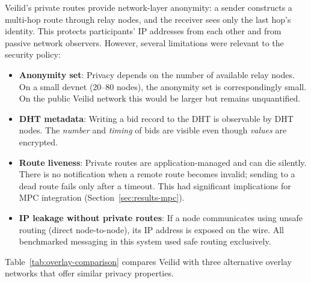 Veilid's private routes provide network-layer anonymity: a sender constructs
a multi-hop route through relay nodes, and the receiver sees only the last
hop's identity.  This protects participants' IP addresses from each other and
from passive network observers.  However, several limitations were relevant to
the security policy:

\begin{itemize}[noitemsep]
  \item \textbf{Anonymity set}: Privacy depends on the number of available
    relay nodes.  On a small devnet (20--80 nodes), the anonymity set is
    correspondingly small.  On the public Veilid network this would be larger
    but remains unquantified.
  \item \textbf{DHT metadata}: Writing a bid record to the DHT is observable
    by DHT nodes.  The \emph{number} and \emph{timing} of bids are visible
    even though \emph{values} are encrypted.
  \item \textbf{Route liveness}: Private routes are application-managed and
    can die silently.  There is no notification when a remote route becomes
    invalid; sending to a dead route fails only after a timeout.  This had
    significant implications for MPC integration
    (Section~\ref{sec:results-mpc}).
  \item \textbf{IP leakage without private routes}: If a node communicates
    using unsafe routing (direct node-to-node), its IP address is exposed on
    the wire.  All benchmarked messaging in this system used safe routing
    exclusively.
\end{itemize}

Table~\ref{tab:overlay-comparison} compares Veilid with three alternative
overlay networks that offer similar privacy properties.

\begin{table}[H]
\centering
\small
\renewcommand{\arraystretch}{1.3}
%
\caption{Overlay network comparison.}
\label{tab:overlay-comparison}
\end{table}

